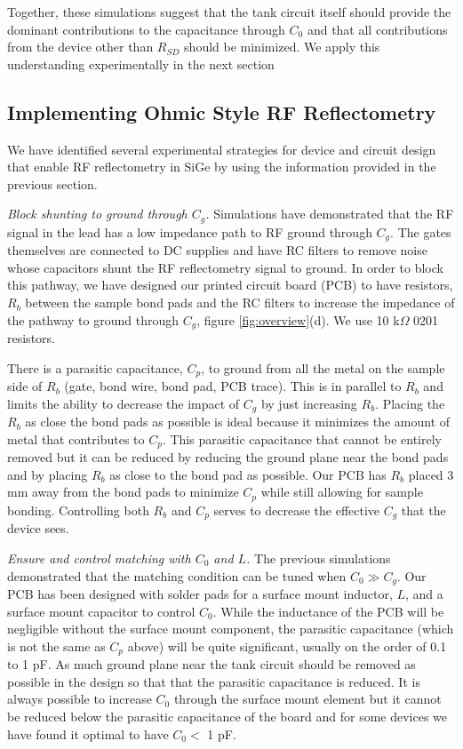 \documentclass{article}
\begin{document}
	Together, these simulations suggest that the tank circuit itself should provide the dominant contributions to the capacitance through $C_0$ and that all contributions from the device other than $R_{SD}$ should be minimized.  We apply this understanding experimentally in the next section

\subsection{Implementing Ohmic Style RF Reflectometry}

	We have identified several experimental strategies for device and circuit design that enable RF reflectometry in SiGe by using the information provided in the previous section.  

	\textit{Block shunting to ground through $C_g$.}  Simulations have demonstrated that the RF signal in the lead has a low impedance path to RF ground through $C_g$.  The gates themselves are connected to DC supplies and have RC filters to remove noise whose capacitors shunt the RF reflectometry signal to ground.  In order to block this pathway, we have designed our printed circuit board (PCB) to have resistors, $R_b$ between the sample bond pads and the RC filters to increase the impedance of the pathway to ground through $C_g$,  figure \ref{fig:overview}(d).  We use 10 k$\Omega$ 0201 resistors.    

	There is a parasitic capacitance, $C_p$, to ground from all the metal on the sample side of $R_b$ (gate, bond wire, bond pad, PCB trace).  This is in parallel to $R_b$ and limits the ability to decrease the impact of $C_g$ by just increasing $R_b$.  Placing the $R_b$ as close the bond pads as possible is ideal because it minimizes the amount of metal that contributes to $C_p$.  This parasitic capacitance that cannot be entirely removed but it can be reduced by reducing the ground plane near the bond pads and by placing $R_b$ as close to the bond pad as possible.   Our PCB has $R_b$ placed 3 mm away from the bond pads to minimize $C_p$ while still allowing for sample bonding.  Controlling both $R_b$ and $C_p$ serves to decrease the effective $C_g$ that the device sees.

	\textit{Ensure and control matching with $C_0$ and $L$.}  The previous simulations demonstrated that the matching condition can be tuned when $C_0 \gg C_g$.  Our PCB has been designed with solder pads for a surface mount inductor, $L$, and a surface mount capacitor to control $C_0$.  While the inductance of the PCB will be negligible without the surface mount component, the parasitic capacitance (which is not the same as $C_p$ above) will be quite significant, usually on the order of 0.1 to 1 pF.  As much ground plane near the tank circuit should be removed as possible in the design so that that the parasitic capacitance is reduced.  It is always possible to increase $C_0$ through the surface mount element but it cannot be reduced below the parasitic capacitance of the board and for some devices we have found it optimal to have $C_0<$ 1 pF.  
\end{document}
